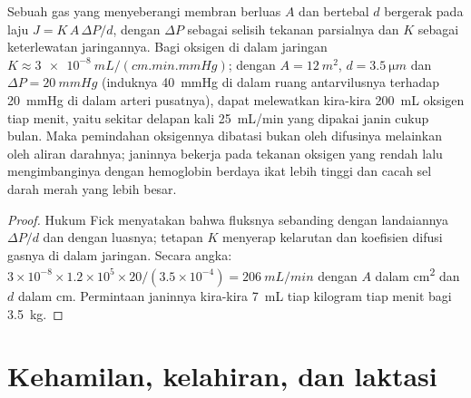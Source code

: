 \begin{theorem}\label{thm:b2:mammal-reproduction:fick}
Sebuah gas yang menyeberangi membran berluas $A$ dan bertebal $d$
bergerak pada laju $J = K\,A\,\Delta P/d$, dengan $\Delta P$ sebagai
selisih tekanan parsialnya dan $K$ sebagai keterlewatan jaringannya.
Bagi oksigen di dalam jaringan $K \approx \qty{3e-8}{mL/(cm.min.mmHg)}$; dengan $A =
\qty{12}{m^2}$, $d = \qty{3.5}{\micro m}$ dan $\Delta P =
\qty{20}{mmHg}$ (induknya \qty{40}{mmHg} di dalam ruang antarvilusnya
terhadap \qty{20}{mmHg} di dalam arteri pusatnya),  dapat
melewatkan kira-kira \qty{200}{mL} oksigen tiap menit, yaitu sekitar
delapan kali \qty{25}{mL/min} yang dipakai janin cukup bulan. Maka
pemindahan oksigennya dibatasi bukan oleh difusinya melainkan oleh
aliran darahnya; janinnya bekerja pada tekanan oksigen yang rendah lalu
mengimbanginya dengan hemoglobin berdaya ikat lebih tinggi dan cacah
sel darah merah yang lebih besar.
\end{theorem}
\begin{proof}
Hukum Fick menyatakan bahwa fluksnya sebanding dengan landaiannya
$\Delta P/d$ dan dengan luasnya; tetapan $K$ menyerap kelarutan dan
koefisien difusi gasnya di dalam jaringan. Secara angka:
$3\times 10^{-8}\times 1.2\times 10^{5}\times 20/(3.5\times 10^{-4})
= \qty{206}{mL/min}$ dengan $A$ dalam \unit{cm^2} dan $d$ dalam \unit{cm}.
Permintaan janinnya kira-kira \qty{7}{mL} tiap kilogram tiap menit bagi
\qty{3.5}{kg}.
\end{proof}

\section{Kehamilan, kelahiran, dan laktasi}


